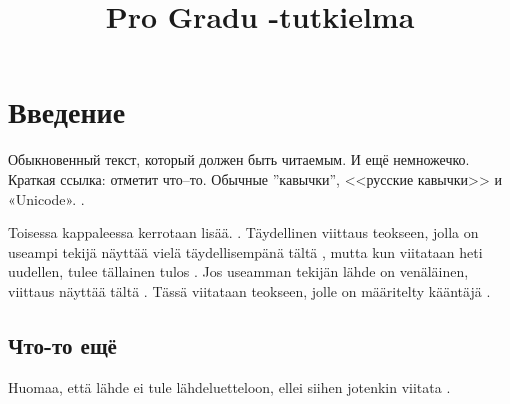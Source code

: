 \documentclass[12pt,a4paper]{article}
\title{Pro Gradu -tutkielma}
\begin{document}


\tableofcontents

\pagebreak


\section{Введение}

Обыкновенный текст, который должен быть читаемым. И ещё немножечко. Краткая ссылка: \textcite[150--152]{kobrinski2013} отметит что–то. Обычные ''кавычки'', <<русские кавычки>> и «Unicode». \parencite[200]{kobrinski2013}.

Toisessa kappaleessa kerrotaan lisää. \parencite{shapir2007}. Täydellinen viittaus teokseen,
jolla on useampi tekijä näyttää vielä täydellisempänä
tältä \parencite[][268]{SKS2007}, mutta kun viitataan heti uudellen, tulee tällainen tulos
\parencite[50]{SKS2007}. Jos useamman tekijän lähde on venäläinen, viittaus näyttää tältä
\parencite{ljustrova1976}. Tässä viitataan teokseen, jolle on määritelty kääntäjä
\parencite[25]{ref:sologub1918}.

\subsection{Что-то ещё}

Huomaa, että lähde ei tule lähdeluetteloon, ellei siihen jotenkin
viitata \parencite[55]{artjunova1983}.


\printbibliography[heading=bibintoc,title={Список использоваемой литературы}]
\end{document}
